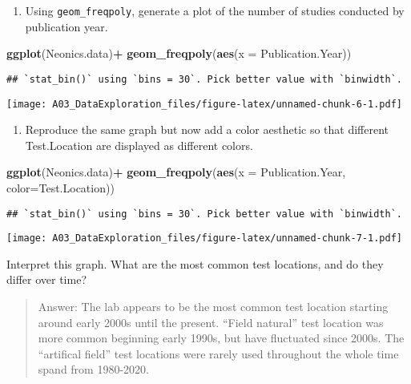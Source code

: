 \documentclass[]{article}
\newenvironment{Shaded}{\begin{snugshade}}{\end{snugshade}}
\newcommand{\DataTypeTok}[1]{\textcolor[rgb]{0.13,0.29,0.53}{#1}}
\newcommand{\KeywordTok}[1]{\textcolor[rgb]{0.13,0.29,0.53}{\textbf{#1}}}
\newcommand{\NormalTok}[1]{#1}
\newcommand{\OperatorTok}[1]{\textcolor[rgb]{0.81,0.36,0.00}{\textbf{#1}}}
\providecommand{\tightlist}{%
  \setlength{\itemsep}{0pt}\setlength{\parskip}{0pt}}
\begin{document}
\begin{enumerate}
\def\labelenumi{\arabic{enumi}.}
\setcounter{enumi}{8}
\tightlist
\item
  Using \texttt{geom\_freqpoly}, generate a plot of the number of
  studies conducted by publication year.
\end{enumerate}

\begin{Shaded}
\begin{Highlighting}[]
\KeywordTok{ggplot}\NormalTok{(Neonics.data)}\OperatorTok{+}
\KeywordTok{geom_freqpoly}\NormalTok{(}\KeywordTok{aes}\NormalTok{(}\DataTypeTok{x =}\NormalTok{ Publication.Year))}
\end{Highlighting}
\end{Shaded}

\begin{verbatim}
## `stat_bin()` using `bins = 30`. Pick better value with `binwidth`.
\end{verbatim}

\texttt{[image: A03\_DataExploration\_files/figure-latex/unnamed-chunk-6-1.pdf]}

\begin{enumerate}
\def\labelenumi{\arabic{enumi}.}
\setcounter{enumi}{9}
\tightlist
\item
  Reproduce the same graph but now add a color aesthetic so that
  different Test.Location are displayed as different colors.
\end{enumerate}

\begin{Shaded}
\begin{Highlighting}[]
\KeywordTok{ggplot}\NormalTok{(Neonics.data)}\OperatorTok{+}
\KeywordTok{geom_freqpoly}\NormalTok{(}\KeywordTok{aes}\NormalTok{(}\DataTypeTok{x =}\NormalTok{ Publication.Year, }\DataTypeTok{color=}\NormalTok{Test.Location))}
\end{Highlighting}
\end{Shaded}

\begin{verbatim}
## `stat_bin()` using `bins = 30`. Pick better value with `binwidth`.
\end{verbatim}

\texttt{[image: A03\_DataExploration\_files/figure-latex/unnamed-chunk-7-1.pdf]}

Interpret this graph. What are the most common test locations, and do
they differ over time?

\begin{quote}
Answer: The lab appears to be the most common test location starting
around early 2000s until the present. ``Field natural'' test location
was more common beginning early 1990s, but have fluctuated since 2000s.
The ``artifical field'' test locations were rarely used throughout the
whole time spand from 1980-2020.
\end{quote}
\end{document}
